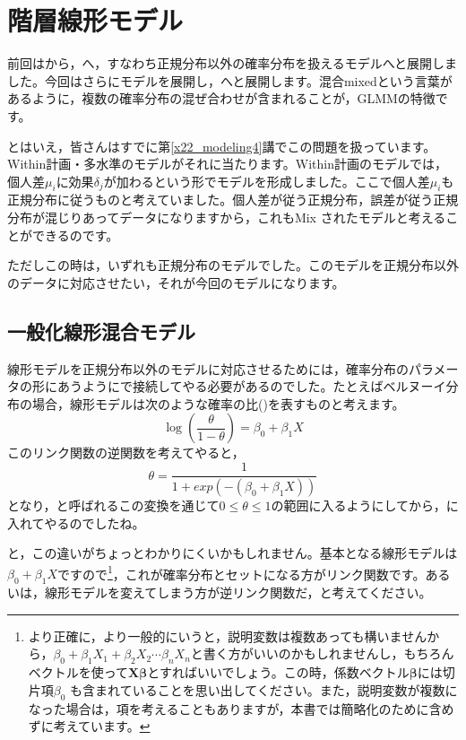\documentclass{ltjsbook}
\begin{document}
\VerbatimFootnotes
\chapter{階層線形モデル}
\label{x25_HLM}
前回はから，へ，すなわち正規分布以外の確率分布を扱えるモデルへと展開しました。今回はさらにモデルを展開し，へと展開します。混合mixedという言葉があるように，複数の確率分布の混ぜ合わせが含まれることが，GLMMの特徴です。

とはいえ，皆さんはすでに第\ref{x22_modeling4}講でこの問題を扱っています。Within計画・多水準のモデルがそれに当たります。Within計画のモデルでは，個人差$\mu_i$に効果$\delta_j$が加わるという形でモデルを形成しました。ここで個人差$\mu_i$も正規分布に従うものと考えていました。個人差が従う正規分布，誤差が従う正規分布が混じりあってデータになりますから，これもMix されたモデルと考えることができるのです。

ただしこの時は，いずれも正規分布のモデルでした。このモデルを正規分布以外のデータに対応させたい，それが今回のモデルになります。
\section{一般化線形混合モデル}
線形モデルを正規分布以外のモデルに対応させるためには，確率分布のパラメータの形にあうようにで接続してやる必要があるのでした。たとえばベルヌーイ分布の場合，線形モデルは次のような確率の比()を表すものと考えます。
\[ \log\left(\frac{\theta}{1-\theta}\right) =  \beta_0 + \beta_1 X \]
このリンク関数の逆関数を考えてやると，
\[ \theta = \frac{1}{1+exp(-(\beta_0+\beta_1 X))} \]
となり，と呼ばれるこの変換を通じて$0 \le \theta \le 1$の範囲に入るようにしてから，に入れてやるのでしたね。

と，この違いがちょっとわかりにくいかもしれません。基本となる線形モデルは$\beta_0 + \beta_1 X$ですので\footnote{より正確に，より一般的にいうと，説明変数は複数あっても構いませんから，$\beta_0 + \beta_1 X_1 + \beta_2 X_2 \cdots \beta_n X_n$と書く方がいいのかもしれませんし，もちろんベクトルを使って$\bm{X\beta}$とすればいいでしょう。この時，係数ベクトル$\bm{\beta}$には切片項$\beta_0$ も含まれていることを思い出してください。また，説明変数が複数になった場合は，項を考えることもありますが，本書では簡略化のために含めずに考えています。}，これが確率分布とセットになる方がリンク関数です。あるいは，線形モデルを変えてしまう方が逆リンク関数だ，と考えてください。
\end{document}
